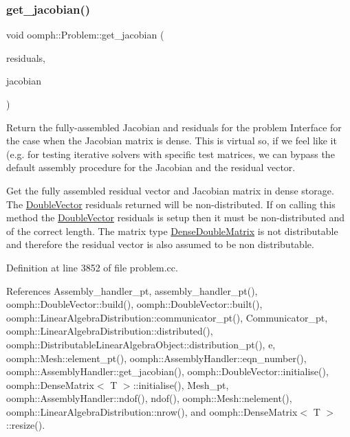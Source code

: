 \subsubsection{\texorpdfstring{get\+\_\+jacobian()}{get\_jacobian()}\hspace{0.1cm}{\footnotesize\ttfamily [1/4]}}
{\footnotesize\ttfamily void oomph\+::\+Problem\+::get\+\_\+jacobian (\begin{DoxyParamCaption}\item[{\hyperlink{classoomph_1_1DoubleVector}{Double\+Vector} \&}]{residuals,  }\item[{\hyperlink{classoomph_1_1DenseDoubleMatrix}{Dense\+Double\+Matrix} \&}]{jacobian }\end{DoxyParamCaption})\hspace{0.3cm}{\ttfamily [virtual]}}



Return the fully-\/assembled Jacobian and residuals for the problem Interface for the case when the Jacobian matrix is dense. This is virtual so, if we feel like it (e.\+g. for testing iterative solvers with specific test matrices, we can bypass the default assembly procedure for the Jacobian and the residual vector. 

Get the fully assembled residual vector and Jacobian matrix in dense storage. The \hyperlink{classoomph_1_1DoubleVector}{Double\+Vector} residuals returned will be non-\/distributed. If on calling this method the \hyperlink{classoomph_1_1DoubleVector}{Double\+Vector} residuals is setup then it must be non-\/distributed and of the correct length. The matrix type \hyperlink{classoomph_1_1DenseDoubleMatrix}{Dense\+Double\+Matrix} is not distributable and therefore the residual vector is also assumed to be non distributable. 

Definition at line 3852 of file problem.\+cc.



References Assembly\+\_\+handler\+\_\+pt, assembly\+\_\+handler\+\_\+pt(), oomph\+::\+Double\+Vector\+::build(), oomph\+::\+Double\+Vector\+::built(), oomph\+::\+Linear\+Algebra\+Distribution\+::communicator\+\_\+pt(), Communicator\+\_\+pt, oomph\+::\+Linear\+Algebra\+Distribution\+::distributed(), oomph\+::\+Distributable\+Linear\+Algebra\+Object\+::distribution\+\_\+pt(), e, oomph\+::\+Mesh\+::element\+\_\+pt(), oomph\+::\+Assembly\+Handler\+::eqn\+\_\+number(), oomph\+::\+Assembly\+Handler\+::get\+\_\+jacobian(), oomph\+::\+Double\+Vector\+::initialise(), oomph\+::\+Dense\+Matrix$<$ T $>$\+::initialise(), Mesh\+\_\+pt, oomph\+::\+Assembly\+Handler\+::ndof(), ndof(), oomph\+::\+Mesh\+::nelement(), oomph\+::\+Linear\+Algebra\+Distribution\+::nrow(), and oomph\+::\+Dense\+Matrix$<$ T $>$\+::resize().



